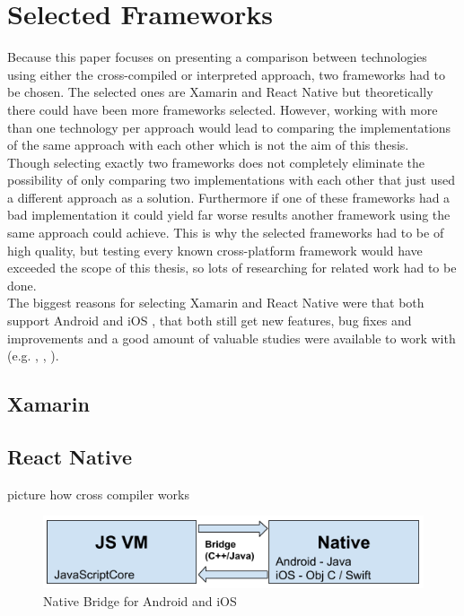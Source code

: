 \documentclass[Bachelor,BIF,english]{twbook}
\begin{document}
\chapter{Selected Frameworks}
Because this paper focuses on presenting a comparison between technologies using either the cross-compiled or interpreted approach, two frameworks had to be chosen. The selected ones are Xamarin and React Native but theoretically there could have been more frameworks selected. However, working with more than one technology per approach would lead to comparing the implementations of the same approach with each other which is not the aim of this thesis. 
\\[\baselineskip]
Though selecting exactly two frameworks does not completely eliminate the possibility of only comparing two implementations with each other that just used a different approach as a solution. Furthermore if one of these frameworks had a bad implementation it could yield far worse results another framework using the same approach could achieve. This is why the selected frameworks had to be of high quality, but testing every known cross-platform framework would have exceeded the scope of this thesis, so lots of researching for related work had to be done. 
\\[\baselineskip]
The biggest reasons for selecting Xamarin and React Native were that both support Android and iOS \cite[p.~1]{JohanssonSderberg2018} \cite[p.~12]{ZubaBernhard2017EdPb}, that both still get new features, bug fixes and improvements \cite{XamarinRoadmap} \cite{ReactNativeRoadmap} and a good amount of valuable studies were available to work with (e.g. \cite{Hansson_Vidhall_2016}, \cite{MartinezLecomte2018}, \cite{GaouarBenamarBendimerad2016}).

\section{Xamarin}
\cite[p.~14-20]{ZubaBernhard2017EdPb} \cite[p.~8-10]{Dickson_2013}

\section{React Native}
\cite{Hansson_Vidhall_2016} \cite{Danielsson_2016} \cite[p.~21-32]{ZubaBernhard2017EdPb}
\cite[p.~14-20]{ZubaBernhard2017EdPb} picture how cross compiler works
\begin{figure}[!htbp]
\centering
\includegraphics[width=0.75\linewidth]{PICs/Bachelor1_NativeBridge.png}
\caption{Native Bridge for Android and iOS \cite{PicReactNativeBridge} \cite[p.~28]{ZubaBernhard2017EdPb}}\label{Fig4}
\end{figure}
\end{document}
